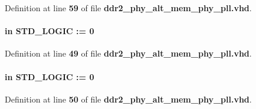 Definition at line {\bf 59} of file {\bf ddr2\+\_\+phy\+\_\+alt\+\_\+mem\+\_\+phy\+\_\+pll.\+vhd}.

\paragraph[{phasestep}]{ {\bfseries \textcolor{keywordflow}{in}\textcolor{vhdlchar}{ }} {\bfseries \textcolor{comment}{S\+T\+D\+\_\+\+L\+O\+G\+IC}\textcolor{vhdlchar}{ }\textcolor{vhdlchar}{ }\textcolor{vhdlchar}{\+:}\textcolor{vhdlchar}{=}\textcolor{vhdlchar}{ }\textcolor{vhdlchar}{ }\textcolor{vhdlchar}{\textquotesingle{}}\textcolor{vhdlchar}{ } \textcolor{vhdldigit}{0} \textcolor{vhdlchar}{ }\textcolor{vhdlchar}{\textquotesingle{}}\textcolor{vhdlchar}{ }} \hspace{0.3cm}{\ttfamily [Port]}}\label{classddr2__phy__alt__mem__phy__pll_a19a2716cc8105544f7a0b1ab41e3d68b}


Definition at line {\bf 49} of file {\bf ddr2\+\_\+phy\+\_\+alt\+\_\+mem\+\_\+phy\+\_\+pll.\+vhd}.

\paragraph[{phaseupdown}]{ {\bfseries \textcolor{keywordflow}{in}\textcolor{vhdlchar}{ }} {\bfseries \textcolor{comment}{S\+T\+D\+\_\+\+L\+O\+G\+IC}\textcolor{vhdlchar}{ }\textcolor{vhdlchar}{ }\textcolor{vhdlchar}{\+:}\textcolor{vhdlchar}{=}\textcolor{vhdlchar}{ }\textcolor{vhdlchar}{ }\textcolor{vhdlchar}{\textquotesingle{}}\textcolor{vhdlchar}{ } \textcolor{vhdldigit}{0} \textcolor{vhdlchar}{ }\textcolor{vhdlchar}{\textquotesingle{}}\textcolor{vhdlchar}{ }} \hspace{0.3cm}{\ttfamily [Port]}}\label{classddr2__phy__alt__mem__phy__pll_a75f59d7e92ed3ec272e3a9a8758b9fe4}


Definition at line {\bf 50} of file {\bf ddr2\+\_\+phy\+\_\+alt\+\_\+mem\+\_\+phy\+\_\+pll.\+vhd}.

